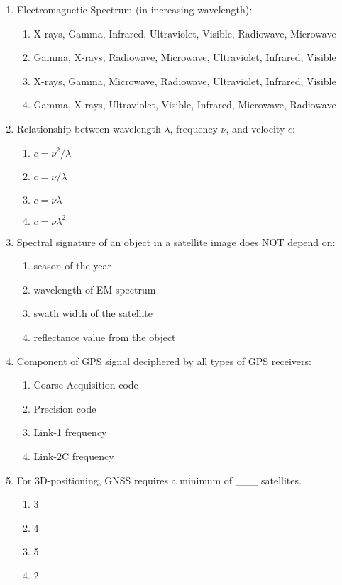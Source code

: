 \documentclass[12pt,a4paper]{article}
\begin{document}
\begin{enumerate}
\item Electromagnetic Spectrum (in increasing wavelength):
\begin{enumerate}
    \item X-rays, Gamma, Infrared, Ultraviolet, Visible, Radiowave, Microwave
    \item Gamma, X-rays, Radiowave, Microwave, Ultraviolet, Infrared, Visible
    \item X-rays, Gamma, Microwave, Radiowave, Ultraviolet, Infrared, Visible
    \item Gamma, X-rays, Ultraviolet, Visible, Infrared, Microwave, Radiowave
\end{enumerate}

\item Relationship between wavelength $\lambda$, frequency $\nu$, and velocity $c$:
\begin{enumerate}
    \item $c = \nu^2 / \lambda$
    \item $c = \nu / \lambda$
    \item $c = \nu \lambda$
    \item $c = \nu \lambda^2$
\end{enumerate}

\item Spectral signature of an object in a satellite image does NOT depend on:
\begin{enumerate}
    \item season of the year
    \item wavelength of EM spectrum
    \item swath width of the satellite
    \item reflectance value from the object
\end{enumerate}

\item Component of GPS signal deciphered by all types of GPS receivers:
\begin{enumerate}
    \item Coarse-Acquisition code
    \item Precision code
    \item Link-1 frequency
    \item Link-2C frequency
\end{enumerate}

\item For 3D-positioning, GNSS requires a minimum of \_\_\_ satellites.
\begin{enumerate}
    \item 3
    \item 4
    \item 5
    \item 2
\end{enumerate}


\end{enumerate}
\end{document}
